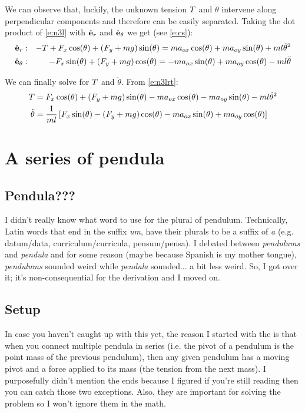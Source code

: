 \documentclass{article}
\begin{document}
We can observe that, luckily, the unknown tension $T$ and $\ddot{\theta}$ intervene along perpendicular components and therefore can be easily separated. Taking the dot product of \cref{e:n3l} with $\hat{\mathbf{e}}_r$ and $\hat{\mathbf{e}}_\theta$ we get (see \cref{e:cs}):
\begin{equation}
  \begin{aligned}
    \hat{\mathbf{e}}_r&:&-T+F_x\cos(\theta)+\left(F_y+mg\right)\sin(\theta)=
    ma_{ox}\cos(\theta)+ma_{oy}\sin(\theta)+ml{\dot\theta}^2 \\
    \hat{\mathbf{e}}_\theta&:&-F_x\sin(\theta)+\left(F_y+mg\right)\cos(\theta)=
    -ma_{ox}\sin(\theta)+ma_{oy}\cos(\theta)-ml\ddot\theta 
  \end{aligned}
  \label{e:n3lrt}
\end{equation}

We can finally solve for $T$ and $\ddot\theta$. From \cref{e:n3lrt}:
\begin{align}
  T&=
  F_x\cos(\theta)+\left(F_y+mg\right)\sin(\theta)-ma_{ox}\cos(\theta)-ma_{oy}\sin(\theta)-ml{\dot\theta}^2
  \label{e:t}
  \\
  \ddot\theta&=
  \frac{1}{ml}\left[
    F_x\sin(\theta)-\left(F_y+mg\right)\cos(\theta)-ma_{ox}\sin(\theta)+ma_{oy}\cos(\theta)
    \right]
  \label{e:ddt}
\end{align}

\section{A series of pendula}
\subsection{Pendula???}
I didn't really know what word to use for the plural of pendulum. Technically, Latin words that end in the suffix \emph{um}, have their plurals to be a suffix of \emph{a} (e.g. datum/data, curriculum/curricula, pensum/pensa). I debated between \emph{pendulums} and \emph{pendula} and for some reason (maybe because Spanish is my mother tongue), \emph{pendulums} sounded weird while \emph{pendula} sounded... a bit less weird. So, I got over it; it's non-consequential for the derivation and I moved on.

\subsection{Setup}
In case you haven't caught up with this yet, the reason I started with the \ntsp is that when you connect multiple pendula in series (i.e. the pivot of a pendulum is the point mass of the previous pendulum), then any given pendulum has a moving pivot and a force applied to its mass (the tension from the next mass). I purposefully didn't mention the ends because I figured if you're still reading then you can catch those two exceptions. Also, they are important for solving the problem so I won't ignore them in the math.
\end{document}
